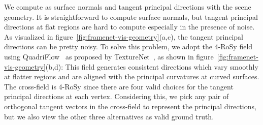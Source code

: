We compute \cframe{} as surface normals and tangent principal directions with the scene geometry. It is straightforward to compute surface normals, but tangent principal directions at flat regions are hard to compute especially in the presence of noise. As visualized in figure~\ref{fig:framenet-vis-geometry}(a,c), the tangent principal directions can be pretty noisy. To solve this problem, we adopt the 4-RoSy field using QuadriFlow~\cite{huang2018quadriflow} as proposed by TextureNet~\cite{huang2018texturenet}, as shown in figure~\ref{fig:framenet-vis-geometry}(b,d): This field generates consistent directions which vary smoothly at flatter regions and are aligned with the principal curvatures at curved surfaces. The cross-field is 4-RoSy since there are four valid choices for the tangent principal directions at each vertex. Considering this, we pick any pair of orthogonal tangent vectors in the cross-field to represent the principal directions, but we also view the other three alternatives as valid ground truth.

